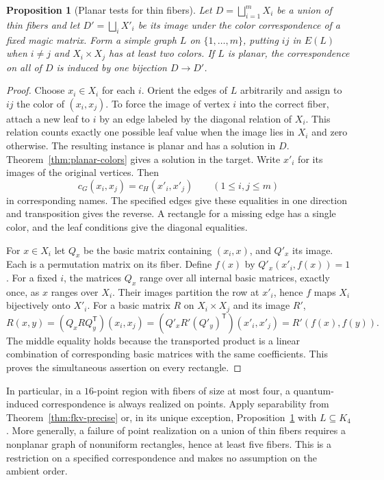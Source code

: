 \documentclass[11pt,reqno]{amsart}
\numberwithin{equation}{section}
\newtheorem{proposition}[theorem]{Proposition}
\theoremstyle{definition}
\begin{document}
\begin{proposition}[Planar tests for thin fibers]\label{prop:thin-planar}
Let $D=\bigsqcup_{i=1}^m X_i$ be a union of thin fibers and let $D'=\bigsqcup_i X'_i$ be its image under the color correspondence of a fixed magic matrix. Form a simple graph $L$ on $\{1,\ldots,m\}$, putting $ij$ in $E(L)$ when $i\ne j$ and $X_i\times X_j$ has at least two colors. If $L$ is planar, the correspondence on all of $D$ is induced by one bijection $D\to D'$.
\end{proposition}
\begin{proof}
Choose $x_i\in X_i$ for each $i$. Orient the edges of $L$ arbitrarily and assign to $ij$ the color of $(x_i,x_j)$. To force the image of vertex $i$ into the correct fiber, attach a new leaf to $i$ by an edge labeled by the diagonal relation of $X_i$. This relation counts exactly one possible leaf value when the image lies in $X_i$ and zero otherwise. The resulting instance is planar and has a solution in $D$. Theorem~\ref{thm:planar-colors} gives a solution in the target. Write $x'_i$ for its images of the original vertices. Then
\[
                    c_G(x_i,x_j)=c_H(x'_i,x'_j)\qquad(1\le i,j\le m)
\]
in corresponding names. The specified edges give these equalities in one direction and transposition gives the reverse. A rectangle for a missing edge has a single color, and the leaf conditions give the diagonal equalities.

For $x\in X_i$ let $Q_x$ be the basic matrix containing $(x_i,x)$, and $Q'_x$ its image. Each is a permutation matrix on its fiber. Define $f(x)$ by $Q'_x(x'_i,f(x))=1$. For a fixed $i$, the matrices $Q_x$ range over all internal basic matrices, exactly once, as $x$ ranges over $X_i$. Their images partition the row at $x'_i$, hence $f$ maps $X_i$ bijectively onto $X'_i$. For a basic matrix $R$ on $X_i\times X_j$ and its image $R'$,
\[
 R(x,y)=(Q_x RQ_y^{\mathsf T})(x_i,x_j)
       =(Q'_x R'(Q'_y)^{\mathsf T})(x'_i,x'_j)
       =R'(f(x),f(y)).
\]
The middle equality holds because the transported product is a linear combination of corresponding basic matrices with the same coefficients. This proves the simultaneous assertion on every rectangle.
\end{proof}

In particular, in a $16$-point region with fibers of size at most four, a quantum-induced correspondence is always realized on points. Apply separability from Theorem~\ref{thm:fkv-precise} or, in its unique exception, Proposition~\ref{prop:thin-planar} with $L\subseteq K_4$. More generally, a failure of point realization on a union of thin fibers requires a nonplanar graph of nonuniform rectangles, hence at least five fibers. This is a restriction on a specified correspondence and makes no assumption on the ambient order.
\end{document}
